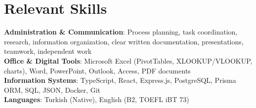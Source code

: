 \documentclass[letterpaper,10pt]{article}
\begin{document}
\section{Relevant Skills}
\begin{itemize}[leftmargin=0.15in, label={}]
  \small{\item{
    \textbf{Administration \& Communication}{: Process planning, task coordination, research, information organization, clear written documentation, presentations, teamwork, independent work} \\
    \textbf{Office \& Digital Tools}{: Microsoft Excel (PivotTables, XLOOKUP/VLOOKUP, charts), Word, PowerPoint, Outlook, Access, PDF documents} \\
    \textbf{Information Systems}{: TypeScript, React, Express.js, PostgreSQL, Prisma ORM, SQL, JSON, Docker, Git} \\
    \textbf{Languages}{: Turkish (Native), English (B2, TOEFL iBT 73)}
  }}
\end{itemize}


\end{document}
